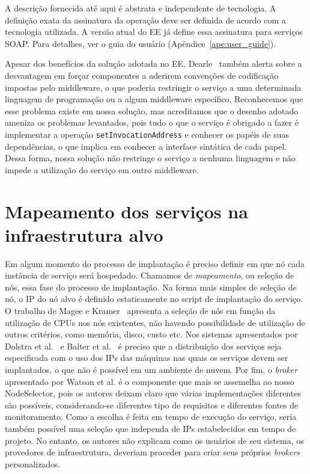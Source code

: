 A descrição fornecida até aqui é abstrata e independente de tecnologia.
A definição exata da assinatura da operação deve ser definida de acordo com a tecnologia utilizada.
A versão atual do EE já define essa assinatura para serviços SOAP.
Para detalhes, ver o guia do usuário (Apêndice~\ref{ape:user_guide}).

Apesar dos benefícios da solução adotada no EE, Dearle~\cite{Dearle2007PastPresentFuture} também alerta sobre a desvantagem em forçar componentes a aderirem convenções de codificação impostas pelo middleware, o que poderia restringir o serviço a uma determinada linguagem de programação ou a algum middleware específico. Reconhecemos que esse problema existe em nossa solução, mas acreditamos que o desenho adotado ameniza os problemas levantados, pois tudo o que o serviço é obrigado a fazer é implementar a operação \texttt{setInvocationAddress} e conhecer os papéis de suas dependências, o que implica em conhecer a interface sintática de cada papel. Dessa forma, nossa solução não restringe o serviço a nenhuma linguagem e não impede a utilização do serviço em outro middleware.

\section{Mapeamento dos serviços na infraestrutura alvo}
\label{sec:mapeamento}

Em algum momento do processo de implantação é preciso definir em que nó cada instância de serviço será hospedado.
Chamamos de \emph{mapeamento}, ou seleção de nós, essa fase do processo de implantação.
Na forma mais simples de seleção de nó, o IP do nó alvo é definido estaticamente no script de implantação do serviço.
O trabalho de Magee e Kramer~\cite{Magee1997Corba} apresenta a seleção de nós em função da utilização de CPUs nos nós existentes, não havendo possibilidade de utilização de outros critérios, como memória, disco, custo etc. Nos sistemas apresentados por Dolstra et al.~\cite{Dolstra2005Configuration} e Balter et al.~\cite{Balter1998Olan} é preciso que a distribuição dos serviços seja especificada com o uso dos IPs das máquinas nas quais os serviços devem ser implantados, o que não é possível em um ambiente de nuvem. Por fim, o \emph{broker} apresentado por Watson et al. é o componente que mais se assemelha ao nosso NodeSelector, pois os autores deixam claro que várias implementações diferentes são possíveis, considerando-se diferentes tipo de requisitos e diferentes fontes de monitoramento. Como a escolha é feita em tempo de execução do serviço, seria também possível uma seleção que independa de IPs estabelecidos em tempo de projeto. No entanto, os autores não explicam como os usuários de seu sistema, os provedores de infraestrutura, deveriam proceder para criar seus próprios \emph{brokers} personalizados.

